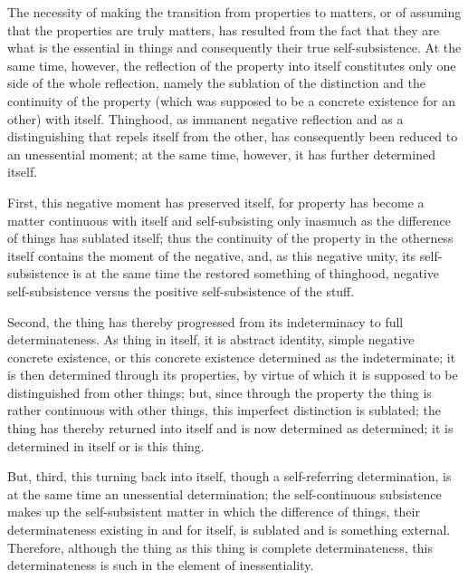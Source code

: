 The necessity of making the transition
from properties to matters,
or of assuming that the properties are truly matters,
has resulted from the fact that they are
what is the essential in things
and consequently their true self-subsistence.
At the same time, however,
the reflection of the property into itself
constitutes only one side of the whole reflection,
namely the sublation of the distinction
and the continuity of the property
(which was supposed to be a concrete existence for an other)
with itself.
Thinghood, as immanent negative reflection
and as a distinguishing that repels itself from the other,
has consequently been reduced to an unessential moment;
at the same time, however, it has further determined itself.

First, this negative moment has preserved itself,
for property has become a matter continuous with itself
and self-subsisting only inasmuch as
the difference of things has sublated itself;
thus the continuity of the property in the otherness
itself contains the moment of the negative,
and, as this negative unity,
its self-subsistence is at the same time
the restored something of thinghood,
negative self-subsistence versus
the positive self-subsistence of the stuff.

Second, the thing has thereby progressed
from its indeterminacy to full determinateness.
As thing in itself, it is abstract identity,
simple negative concrete existence,
or this concrete existence
determined as the indeterminate;
it is then determined through its properties,
by virtue of which it is supposed to be
distinguished from other things;
but, since through the property the thing is
rather continuous with other things,
this imperfect distinction is sublated;
the thing has thereby returned into itself
and is now determined as determined;
it is determined in itself or is this thing.

But, third, this turning back into itself,
though a self-referring determination,
is at the same time an unessential determination;
the self-continuous subsistence makes up
the self-subsistent matter
in which the difference of things,
their determinateness existing in and for itself,
is sublated and is something external.
Therefore, although the thing as this thing
is complete determinateness,
this determinateness is such
in the element of inessentiality.

